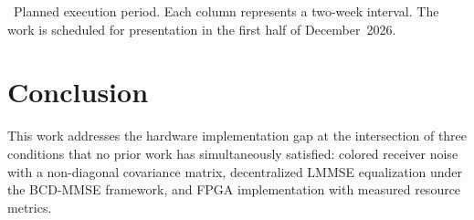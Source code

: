 \documentclass[12pt]{article}
\begin{document}
\vskip 0.2cm
{\small \colorbox{gray!70}{\phantom{xx}}\ Planned execution period.
Each column represents a two-week interval.
The work is scheduled for presentation in the first half of December~2026.}

\section{Conclusion}
\label{sec:conclusion}


This work addresses the hardware implementation gap at the intersection
of three conditions that no prior work has simultaneously satisfied:
colored receiver noise with a non-diagonal covariance matrix, decentralized
LMMSE equalization under the BCD-MMSE framework, and FPGA implementation
with measured resource metrics.
\end{document}

